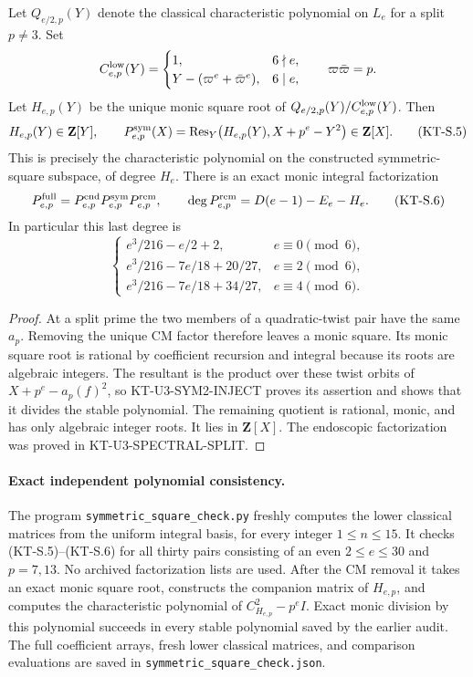 \begin{corollary}
Let $Q_{e/2,p}(Y)$ denote the classical characteristic polynomial
on $L_e$ for a split $p\ne3$.  Set
\[
 C^{\rm low}_{e,p}(Y)=
 \begin{cases}
 1,&6\nmid e,\\
 Y-(\varpi^e+\bar\varpi^e),&6\mid e,
 \end{cases}
 \qquad\varpi\bar\varpi=p.
\]
Let $H_{e,p}(Y)$ be the unique monic square root of
$Q_{e/2,p}(Y)/C^{\rm low}_{e,p}(Y)$.  Then
\[
 H_{e,p}(Y)\in\mathbf Z[Y],\qquad
 P^{\rm sym}_{e,p}(X)
   =\operatorname{Res}_{Y}
          \bigl(H_{e,p}(Y),X+p^e-Y^2\bigr)\in\mathbf Z[X].
                                                               \tag{KT-S.5}
\]
This is precisely the characteristic polynomial on the
constructed symmetric-square subspace, of degree $H_e$.
There is an exact monic integral factorization
\[
 P^{\rm full}_{e,p}
     =P^{\rm end}_{e,p}P^{\rm sym}_{e,p}P^{\rm rem}_{e,p},
 \qquad
 \deg P^{\rm rem}_{e,p}=D(e-1)-E_e-H_e.              \tag{KT-S.6}
\]
In particular this last degree is
\[
 \begin{cases}
 e^3/216-e/2+2,&e\equiv0\pmod6,\\
 e^3/216-7e/18+20/27,&e\equiv2\pmod6,\\
 e^3/216-7e/18+34/27,&e\equiv4\pmod6.
 \end{cases}
\]
\end{corollary}
\begin{proof}
At a split prime the two members of a quadratic-twist pair
have the same $a_p$.  Removing the unique CM factor therefore
leaves a monic square.  Its monic square root is rational by
coefficient recursion and integral because its roots are
algebraic integers.  The resultant is the product over these
twist orbits of $X+p^e-a_p(f)^2$, so KT-U3-SYM2-INJECT proves
its assertion and shows that it divides the stable polynomial.
The remaining quotient is rational, monic, and has only
algebraic integer roots.  It lies in $\mathbf Z[X]$.
The endoscopic factorization was proved in KT-U3-SPECTRAL-SPLIT.
\end{proof}

\paragraph{Exact independent polynomial consistency.}
The program \texttt{symmetric\_square\_check.py} freshly computes
the lower classical matrices from the uniform integral basis,
for every integer $1\leq n\leq15$.  It checks (KT-S.5)--(KT-S.6)
for all thirty pairs consisting of an even $2\leq e\leq30$
and $p=7,13$.  No archived factorization lists are used.
After the CM removal it takes an exact monic square root,
constructs the companion matrix of $H_{e,p}$, and computes
the characteristic polynomial of $C_{H_{e,p}}^2-p^eI$.
Exact monic division by this polynomial succeeds in every
stable polynomial saved by the earlier audit.  The full
coefficient arrays, fresh lower classical matrices, and
comparison evaluations are saved in
\texttt{symmetric\_square\_check.json}.

